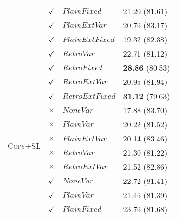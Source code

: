 \documentclass[11pt,letterpaper]{article}
\begin{document}
\begin{table}
\begin{tabular}{|l|l|l|l| }
 & $\checkmark$ & $PlainFixed$ &  21.20 (81.61) \\
 & $\checkmark$ & $PlainExtVar$  & 20.76 (83.17) \\
 & $\checkmark$ & $PlainExtFixed$  & 19.32 (82.38) \\
 & $\checkmark$ & $RetroVar$ &  22.71 (81.12) \\
 & $\checkmark$ & $RetroFixed$ &  \textbf{28.86} (80.53) \\
 & $\checkmark$ & $RetroExtVar$  & 20.95 (81.94) \\
 & $\checkmark$ & $RetroExtFixed$  & \textbf{31.12} (79.63) \\
 \hline
\multirow{6}{*}{\textsc{Copy+SL}} & $\times$ & $NoneVar$ & 17.88 (83.70) \\
& $\times$ & $PlainVar$ & 20.22 (81.52) \\
 & $\times$ & $PlainExtVar$  & 20.14 (83.46) \\   
 & $\times$ & $RetroVar$ &  21.30 (81.22) \\ 
 & $\times$ & $RetroExtVar$  & 21.52 (82.86) \\ 
 & $\checkmark$ & $NoneVar$ &  22.72 (81.41) \\
 & $\checkmark$ & $PlainVar$ &  21.46 (81.39) \\ 
 & $\checkmark$ & $PlainFixed$ &  23.76 (81.68) \\

\end{tabular}
\end{table}
\end{document}
